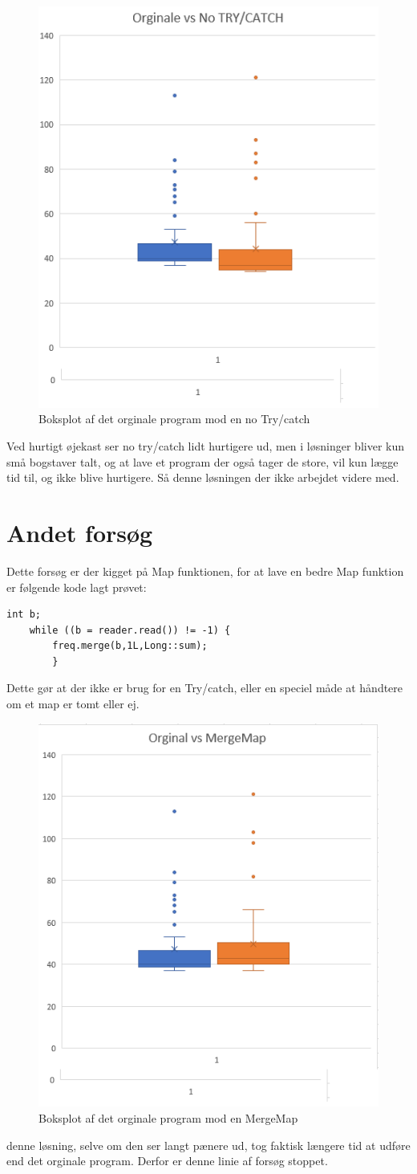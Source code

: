 \newpage
\begin{figure}
  \includegraphics[width=0.4\linewidth]{orginalboksvstry.png}
  \caption{Boksplot af det orginale program mod en no Try/catch}
  \label{fig:orginalvstry}
\end{figure}
Ved hurtigt øjekast ser no try/catch lidt hurtigere ud, men i løsninger bliver kun små bogstaver talt, og at lave et program der også tager de store, vil kun lægge tid til, og ikke blive hurtigere. Så denne løsningen der ikke arbejdet videre med.
\newpage


\section*{Andet forsøg}
Dette forsøg er der kigget på Map funktionen, for at lave en bedre Map funktion er følgende kode lagt prøvet:

\begin{lstlisting}
int b;
	while ((b = reader.read()) != -1) {
		freq.merge(b,1L,Long::sum);
        }
\end{lstlisting}
Dette gør at der ikke er brug for en Try/catch, eller en speciel måde at håndtere om et map er tomt eller ej.

\newpage
\begin{figure}
  \includegraphics[width=0.4\linewidth]{orginalboksvsmerge.png}
  \caption{Boksplot af det orginale program mod en MergeMap}
  \label{fig:orginalvsmerge}
\end{figure}
denne løsning, selve om den ser langt pænere ud, tog faktisk længere tid at udføre end det orginale program. Derfor er denne linie af forsøg stoppet.
\newpage

